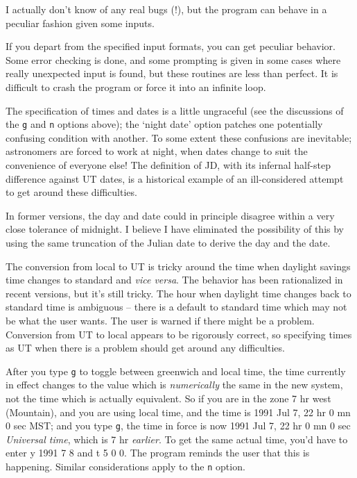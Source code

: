 
I actually don't know of any real bugs (!), but the program
can behave in a peculiar fashion given some inputs.

If you depart from the specified input formats, you can get 
peculiar behavior.  Some error checking is done, and some prompting
is given in some cases where really unexpected input is found, but
these routines are less than perfect.  It is difficult
to crash the program or force it into an infinite loop.

The specification of times and dates is a little ungraceful (see the
discussions of the {\tt g} and {\tt n} options above); the
`night date' option patches one potentially confusing condition with another.
To some extent these confusions are inevitable; astronomers are forced to
work at night, when dates change to suit the convenience of
everyone else!  The definition of JD, with its infernal half-step
difference against UT dates, is a historical example of an ill-considered
attempt to get around these difficulties.  

In former versions, the day and date could in principle disagree 
within a very close tolerance of midnight.  I believe I have
eliminated the possibility of this by using the same truncation
of the Julian date to derive the day and the date.

The conversion from local to UT is tricky around
the time when daylight savings time changes to standard
and {\it vice versa}.  The behavior has been rationalized in 
recent versions, but it's still tricky.  The hour when 
daylight time changes back to standard time is ambiguous -- there
is a default to standard time which may not be what the user wants.  
The user is warned if
there might be a problem.  Conversion from UT to local appears
to be rigorously correct, so specifying times as UT when there
is a problem should get around any difficulties.

After you type {\tt g} to toggle between greenwich and local
time, the time currently in effect changes to the value
which is {\it numerically} the same in the new system, not the
time which is actually equivalent.  So if you are in the zone
7 hr west (Mountain), and you are using local time, and
the time is 1991 Jul 7, 22 hr 0 mn 0 sec MST; and you type {\tt g},
the time in force is now 1991 Jul 7, 22 hr 0 mn 0 sec {\it Universal time},
which is 7 hr {\it earlier}.  To get the same actual time, you'd have to
enter y 1991 7 8 and t 5 0 0.  The program reminds the user
that this is happening.  Similar considerations apply to the
{\tt n} option.

